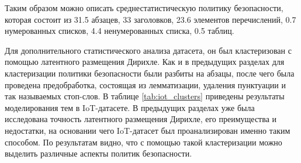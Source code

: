 \documentclass[../main]{subfiles}
\begin{document}
Таким образом можно описать среднестатистическую политику безопасности, которая состоит из 31.5 абзацев, 33 заголовков, 23.6 элементов перечислений, 0.7 нумерованных списков, 4.4 ненумерованных списка, 0.5 таблиц.

Для дополнительного статистического анализа датасета, он был кластеризован с помощью латентного размещения Дирихле. Как и в предыдущих разделах для кластеризации политики безопасности были разбиты на абзацы, после чего была проведена предобработка, состоящая из лемматизации, удаления пунктуации и так называемых стоп-слов. В таблице \ref{tab:iot_clusters} приведены результаты моделирования тем в IoT-датасете. В предыдущих разделах уже была исследована точность латентного размещения Дирихле, его преимущества и недостатки, на основании чего IoT-датасет был проанализирован именно таким способом. По результатам видно, что с помощью такой кластеризации можно выделить различные аспекты политик безопасности.
\end{document}
